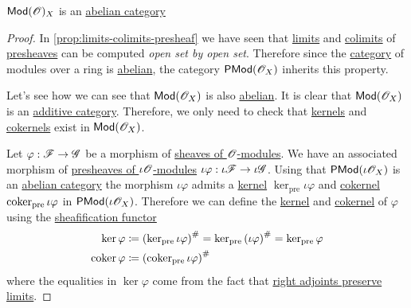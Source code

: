 \documentclass[../../../main]{subfiles}
\begin{document}
\begin{theorem} \label{thm:mod-ox-is-abelian}
  \(\mathsf{Mod}(\mathscr{O})_{X}\) is an \hyperref[def:abelian-category]{abelian category}
\end{theorem}
\begin{proof}
  In \autoref{prop:limits-colimits-presheaf} we have seen that \hyperref[def:categorical-limit]{limits} and \hyperref[def:categorical-colimit]{colimits} of \hyperref[def:presheaf]{presheaves} can be computed \textit{open set by open set}.
  Therefore since the \hyperref[def:category]{category} of modules over a ring is \hyperref[def:abelian-category]{abelian}, the category \(\mathsf{PMod}(\mathscr{O}_{X})\) inherits this property.

  Let's see how we can see that \(\mathsf{Mod}(\mathscr{O}_{X})\) is also \hyperref[def:abelian-category]{abelian}.
  It is clear that \(\mathsf{Mod}(\mathscr{O}_{X})\) is an \hyperref[def:additive-category]{additive category}.
  Therefore, we only need to check that \hyperref[def:categorical-kernel]{kernels} and \hyperref[def:categorical-cokernel]{cokernels} exist in \(\mathsf{Mod}(\mathscr{O}_{X})\).

  Let \(\varphi: \mathscr{F} \to \mathscr{G}\) be a morphism of \hyperref[def:sheaf-of-modules]{sheaves of \(\mathscr{O}\)-modules}.
  We have an associated morphism of \hyperref[def:presheaf-of-modules]{presheaves of \(\iota\mathscr{O}\)-modules} \(\iota\varphi: \iota\mathscr{F} \to \iota\mathscr{G}\).
  Using that \(\mathsf{PMod}(\iota\mathscr{O}_{X})\) is an \hyperref[def:abelian-category]{abelian category} the morphism \(\iota\varphi\) admits a \hyperref[def:categorical-kernel]{kernel} \(\ker_{\operatorname{pre}} \iota \varphi\) and \hyperref[def:categorical-cokernel]{cokernel} \(\operatorname*{coker}_{\operatorname{pre}} \iota\varphi\) in \(\mathsf{PMod}(\iota\mathscr{O}_{X})\).
  Therefore we can define the \hyperref[def:categorical-kernel]{kernel} and \hyperref[def:categorical-cokernel]{cokernel} of \(\varphi\) using the \hyperref[def:sheafification]{sheafification functor}
  \begin{align*}
    \ker \varphi &\coloneq \left( \ker_{\operatorname{pre}} \iota\varphi \right)^{\#} = \ker_{\operatorname{pre}} \left( \iota \varphi \right)^{\#} = \ker_{\operatorname{pre}} \varphi \\
    \operatorname*{coker} \varphi &\coloneq \left( \operatorname{coker}_{\operatorname{pre}} \iota\varphi \right)^{\#}
  \end{align*}
  where the equalities in \(\ker \varphi\) come from the fact that \hyperref[prop:adjoint-properties]{right adjoints preserve limits}.
\end{proof}
\end{document}
